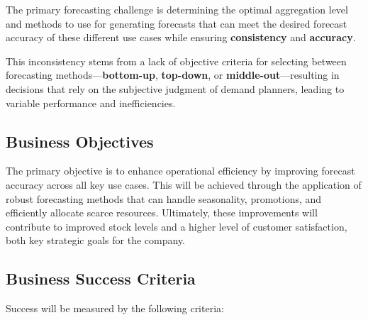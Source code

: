 \documentclass[
  american,
  10,
  a4paper,
]{book}
\theoremstyle{definition}
\theoremstyle{remark}
\begin{document}
The primary forecasting challenge is determining the optimal aggregation
level and methods to use for generating forecasts that can meet the
desired forecast accuracy of these different use cases while ensuring
\textbf{consistency} and \textbf{accuracy}.

This inconsistency stems from a lack of objective criteria for selecting
between forecasting methods---\textbf{bottom-up}, \textbf{top-down}, or
\textbf{middle-out}---resulting in decisions that rely on the subjective
judgment of demand planners, leading to variable performance and
inefficiencies.

\subsection{Business Objectives}\label{business-objectives}

The primary objective is to enhance operational efficiency by improving
forecast accuracy across all key use cases. This will be achieved
through the application of robust forecasting methods that can handle
seasonality, promotions, and efficiently allocate scarce resources.
Ultimately, these improvements will contribute to improved stock levels
and a higher level of customer satisfaction, both key strategic goals
for the company.

\subsection{Business Success Criteria}\label{business-success-criteria}

Success will be measured by the following criteria:
\end{document}
